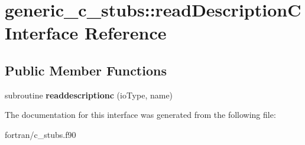 \hypertarget{interfacegeneric__c__stubs_1_1read_description_c}{}\section{generic\+\_\+c\+\_\+stubs\+:\+:read\+DescriptionC Interface Reference}
\label{interfacegeneric__c__stubs_1_1read_description_c}
\subsection*{Public Member Functions}
\begin{DoxyCompactItemize}
\item 
\mbox{\label{interfacegeneric__c__stubs_1_1read_description_c_a2a6d297791da9f8144926168c120ab6f}} 
subroutine {\bfseries readdescriptionc} (io\+Type, name)
\end{DoxyCompactItemize}


The documentation for this interface was generated from the following file\+:\begin{DoxyCompactItemize}
\item 
fortran/c\+\_\+stubs.\+f90\end{DoxyCompactItemize}

